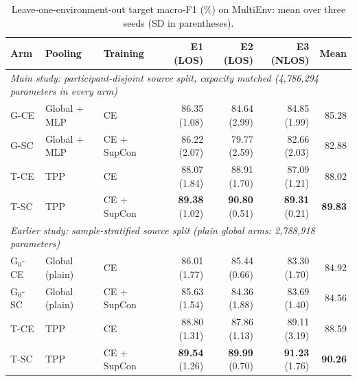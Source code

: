 \begin{table}[t]
\caption{Leave-one-environment-out target macro-F1 (\%) on MultiEnv: mean over three seeds (SD in parentheses).}
\label{tab:main}
\centering\footnotesize
\begin{tabular}{lllrrrr}
\toprule
Arm & Pooling & Training & E1 (LOS) & E2 (LOS) & E3 (NLOS) & Mean\\
\midrule
\multicolumn{7}{l}{\textit{Main study: participant-disjoint source split, capacity matched (4,786,294 parameters in every arm)}}\\
G-CE & Global + MLP & CE & 86.35 (1.08) & 84.64 (2.99) & 84.85 (1.99) & 85.28\\
G-SC & Global + MLP & CE + SupCon & 86.22 (2.07) & 79.77 (2.59) & 82.66 (2.03) & 82.88\\
T-CE & TPP & CE & 88.07 (1.84) & 88.91 (1.70) & 87.09 (1.21) & 88.02\\
T-SC & TPP & CE + SupCon & \textbf{89.38} (1.02) & \textbf{90.80} (0.51) & \textbf{89.31} (0.21) & \textbf{89.83}\\
\midrule
\multicolumn{7}{l}{\textit{Earlier study: sample-stratified source split (plain global arms: 2,788,918 parameters)}}\\
G$_0$-CE & Global (plain) & CE & 86.01 (1.77) & 85.44 (0.66) & 83.30 (1.70) & 84.92\\
G$_0$-SC & Global (plain) & CE + SupCon & 85.63 (1.54) & 84.36 (1.88) & 83.69 (1.40) & 84.56\\
T-CE & TPP & CE & 88.80 (1.31) & 87.86 (1.13) & 89.11 (3.19) & 88.59\\
T-SC & TPP & CE + SupCon & \textbf{89.54} (1.26) & \textbf{89.99} (0.70) & \textbf{91.23} (1.76) & \textbf{90.26}\\
\bottomrule
\end{tabular}
\end{table}
